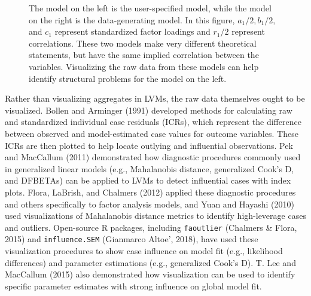 \documentclass[
  english,
  man]{apa6}
\begin{document}
\begin{figure}
\begin{center}
\caption{The model on the left is the user-specified model, while the model on the right is the data-generating model. In this figure, $a_1/2, b_1/2,$ and $c_1$ represent standardized factor loadings and $r_1/2$ represent correlations. These two models make very different theoretical statements, but have the same implied correlation between the variables. Visualizing the raw data from these models can help identify structural problems for the model on the left.}
\label{fig:implied}
\end{center}
\end{figure}

Rather than visualizing aggregates in LVMs, the raw data themselves ought to be visualized. Bollen and Arminger (1991) developed methods for calculating raw and standardized individual case residuals (ICRs), which represent the difference between observed and model-estimated case values for outcome variables. These ICRs are then plotted to help locate outlying and influential observations. Pek and MacCallum (2011) demonstrated how diagnostic procedures commonly used in generalized linear models (e.g., Mahalanobis distance, generalized Cook's D, and DFBETAs) can be applied to LVMs to detect influential cases with index plots. Flora, LaBrish, and Chalmers (2012) applied these diagnostic procedures and others specifically to factor analysis models, and Yuan and Hayashi (2010) used visualizations of Mahalanobis distance metrics to identify high-leverage cases and outliers. Open-source R packages, including \texttt{faoutlier} (Chalmers \& Flora, 2015) and \texttt{influence.SEM} (Gianmarco Altoe', 2018), have used these visualization procedures to show case influence on model fit (e.g., likelihood differences) and parameter estimations (e.g., generalized Cook's D). T. Lee and MacCallum (2015) also demonstrated how visualization can be used to identify specific parameter estimates with strong influence on global model fit.
\end{document}
